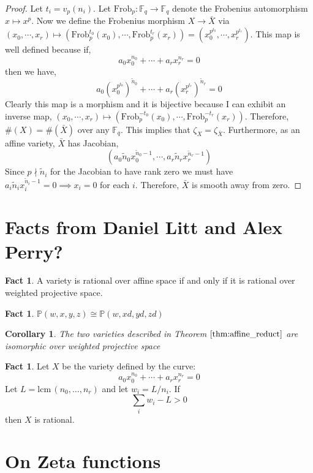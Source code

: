 \documentclass{article}
\newcommand{\F}{\mathbb{F}}
\newcommand{\Pro}{\mathbb{P}}
\newcommand{\Frob}[0]{\mathrm{Frob}}
\newcommand{\finfield}[1]{\mathbb{F}_{#1}}
\newcommand{\lcm}[0]{\mathrm{lcm} \,}
\newtheorem{corollary}{Corollary}[theorem]
\theoremstyle{definition}
\theoremstyle{definition}
\newtheorem{fact}[theorem]{Fact}
\theoremstyle{remark}
\begin{document}
\begin{proof}
Let $t_i = v_p(n_i)$. Let $\Frob_p : \finfield{q} \to \finfield{q}$ denote the Frobenius automorphism $x \mapsto x^p$. Now we define the Frobenius morphism $X \to \bar{X}$ via $(x_0, \cdots, x_r) \mapsto (\Frob_p^{t_0} (x_0), \cdots, \Frob_p^{t_r} (x_r)) = (x_0^{p^{t_0}}, \cdots, x_r^{p^{t_r}})$. This map is well defined because if,
\[ a_0 x_0^{n_0} + \cdots + a_r x_r^{n_r} = 0 \]
then we have,
\[  a_0 (x_0^{p^{t_0}})^{\tilde{n}_0} + \cdots + a_r (x_r^{p^{t_r}})^{\tilde{n}_r} = 0  \]
Clearly this map is a morphism and it is bijective because I can exhibit an inverse map, $(x_0, \cdots, x_r) \mapsto (\Frob_p^{-t_0} (x_0), \cdots, \Frob_p^{-t_r} (x_r))$. Therefore, $\#(X) = \#(\bar{X})$ over any $\F_q$. This implies that $\zeta_X = \zeta_{\bar{X}}$.
Furthermore, as an affine variety, $\bar{X}$ has Jacobian,
\[ (a_0 \tilde{n}_0 x_0^{\tilde{n}_0 - 1}, \cdots, a_r \tilde{n}_r x_r^{\tilde{n}_r - 1})  \]
Since $p \nmid \tilde{n}_i$ for the Jacobian to have rank zero we must have $a_i \tilde{n}_i x_i^{\tilde{n}_i - 1} = 0 \implies x_i = 0$ for each $i$. Therefore, $\bar{X}$ is smooth away from zero. 
\end{proof}


\section{Facts from Daniel Litt and Alex Perry?}

\begin{fact}
A variety is rational over affine space if and only if it is rational over weighted projective space.
\end{fact}

\begin{fact}
$\Pro(w,x,y,z) \cong \Pro(w,xd,yd,zd)$
\end{fact}
\begin{corollary}
The two varieties described in Theorem $\ref{thm:affine_reduct}
$ are isomorphic over weighted projective space
\end{corollary}
\begin{fact}
Let $X$ be the variety defined by the curve:
\[a_0x_0^{n_0} + \cdots + a_r x_r^{n_r} = 0\]
Let $L = \lcm(n_0,\ldots, n_r)$ and let $w_i = L/n_i$. If
\[\sum_i w_i - L > 0\]
then $X$ is rational.
\end{fact}


\section{On Zeta functions} 
\end{document}
